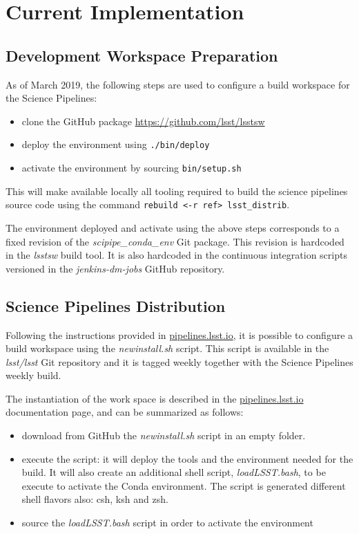 \newpage
\section{Current Implementation} \label{sec:actual}

\subsection{Development Workspace Preparation} \label{sec:envset} 
As of March 2019, the following steps are used to configure a build workspace for the Science Pipelines:

\begin{itemize}
\item clone the GitHub package \url{https://github.com/lsst/lsstsw}
\item deploy the environment using \texttt{./bin/deploy}
\item activate the environment by sourcing \texttt{bin/setup.sh}
\end{itemize}

This will make available locally all tooling required to build the science pipelines source code using the command \texttt{rebuild <-r ref> lsst\_distrib}.

The environment deployed and activate using the above steps corresponds to a fixed revision of the \textit{scipipe\_conda\_env} Git package.
This revision is hardcoded in the \textit{lsstsw} build tool. It is also hardcoded in the continuous integration scripts versioned in the \textit{jenkins-dm-jobs} GitHub repository.


\subsection{Science Pipelines Distribution} \label{sec:distrib}

Following the instructions provided in \url{pipelines.lsst.io}, it is possible to configure a build workspace using the \textit{newinstall.sh} script.
This script is available in the \textit{lsst/lsst} Git repository and it is tagged weekly together with the Science Pipelines weekly build.

The instantiation of the work space is described in the \url{pipelines.lsst.io} documentation page, and can be summarized as follows:

\begin{itemize}
\item download from GitHub the \textit{newinstall.sh} script in an empty folder.
\item execute the script: it will deploy the tools and the environment needed for the build. It will also create an additional shell script, \textit{loadLSST.bash}, to be execute to activate the Conda environment. The script is generated different shell flavors also: csh, ksh and zsh.
\item source the \textit{loadLSST.bash} script in order to activate the environment 
\end{itemize}

